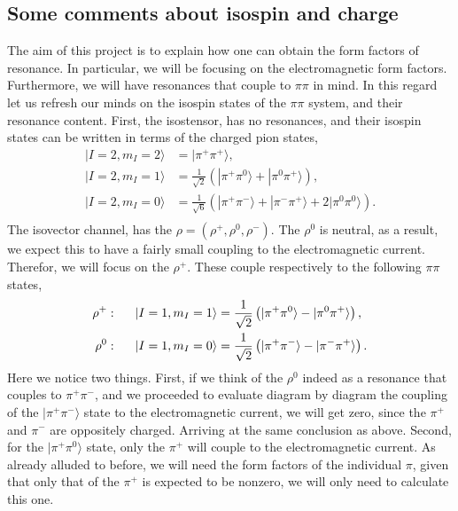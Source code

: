 \subsection{Some comments about isospin and charge}
The aim of this project is to explain how one can obtain the form factors of resonance. In particular, we will be focusing on the electromagnetic form factors. Furthermore, we will have resonances that couple to $\pi\pi$ in mind. In this regard let us refresh our minds on the isospin states of the $\pi\pi$ system, and their resonance content. First, the isostensor, has no resonances, and their isospin states can be written in terms of the charged pion states,
\begin{align}
|I=2,m_I=2\rangle&=|\pi^+\pi^+\rangle,\\
|I=2,m_I=1\rangle&=\frac{1}{\sqrt{2}}\left(|\pi^+\pi^0\rangle+|\pi^0\pi^+\rangle\right),\\
|I=2,m_I=0\rangle&=\frac{1}{\sqrt{6}}\left(|\pi^+\pi^-\rangle+|\pi^-\pi^+\rangle+2|\pi^0\pi^0\rangle\right).\\
\end{align}
The isovector channel, has the $\rho=(\rho^+,\rho^0,\rho^-)$. The $\rho^0$ is neutral, as a result, we expect this to have a fairly small coupling to the electromagnetic current. Therefor, we will focus on the $\rho^+$. These couple respectively to the following $\pi\pi$ states,
\begin{align}
\rho^+:\hspace{.5cm}|I=1,m_I=1\rangle&=\frac{1}{\sqrt{2}}\left(|\pi^+\pi^0\rangle-|\pi^0\pi^+\rangle\right),\\
\rho^0:\hspace{.5cm}|I=1,m_I=0\rangle&=\frac{1}{\sqrt{2}}\left(|\pi^+\pi^-\rangle-|\pi^-\pi^+\rangle\right).\\
\end{align}
Here we notice two things. First, if we think of the $\rho^0$ indeed as a resonance that couples to $\pi^+\pi^-$, and we proceeded to evaluate diagram by diagram the coupling of the $|\pi^+\pi^-\rangle$ state to the electromagnetic current, we will get zero, since the $\pi^+$ and $\pi^-$ are oppositely charged. Arriving at the same conclusion as above. Second, for the $|\pi^+\pi^0\rangle$ state, only the $\pi^+$ will couple to the electromagnetic current. As already alluded to before, we will need the form factors of the individual $\pi$, given that only that of the $\pi^+$ is expected to be nonzero, we will only need to calculate this one. 


